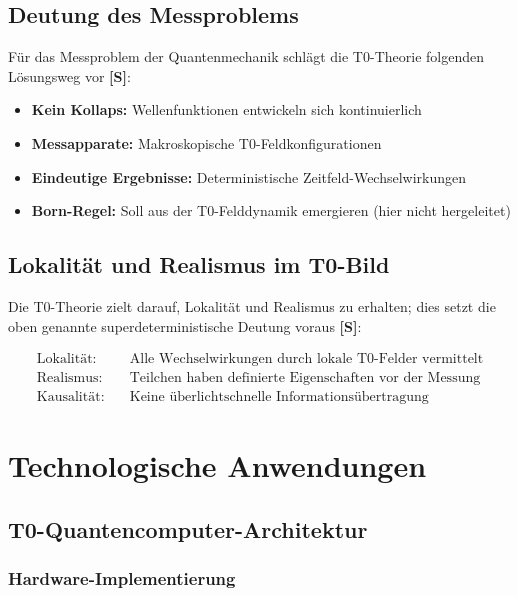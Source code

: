 	\subsection{Deutung des Messproblems}
	
	Für das Messproblem der Quantenmechanik schlägt die T0-Theorie folgenden Lösungsweg vor \textbf{[S]}:
	
	\begin{itemize}
		\item \textbf{Kein Kollaps:} Wellenfunktionen entwickeln sich kontinuierlich
		\item \textbf{Messapparate:} Makroskopische T0-Feldkonfigurationen
		\item \textbf{Eindeutige Ergebnisse:} Deterministische Zeitfeld-Wechselwirkungen
		\item \textbf{Born-Regel:} Soll aus der T0-Felddynamik emergieren (hier nicht hergeleitet)
	\end{itemize}
	
	\subsection{Lokalität und Realismus im T0-Bild}
	
	Die T0-Theorie zielt darauf, Lokalität und Realismus zu erhalten; dies setzt die oben genannte superdeterministische Deutung voraus \textbf{[S]}:
	
	\begin{align}
		\text{Lokalität:} &\quad \text{Alle Wechselwirkungen durch lokale T0-Felder vermittelt} \\
		\text{Realismus:} &\quad \text{Teilchen haben definierte Eigenschaften vor der Messung} \\
		\text{Kausalität:} &\quad \text{Keine überlichtschnelle Informationsübertragung}
	\end{align}
	
	\section{Technologische Anwendungen}
	
	\subsection{T0-Quantencomputer-Architektur}
	
	\subsubsection{Hardware-Implementierung}
	

